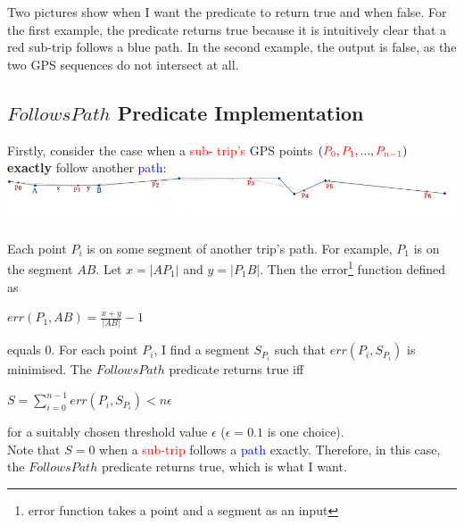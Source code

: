 \documentclass[12pt,a4paper,oneside,openright]{report}
\begin{document}
Two pictures show when I want the predicate to return true and when false.
For the first example, the predicate returns true because it is intuitively
clear that a red sub-trip follows a blue path. In the second example, the
output is false, as the two GPS sequences do not intersect at all.

\newpage

\subsection{$FollowsPath$ Predicate Implementation}

Firstly, consider the case when a \textcolor{red}{sub- trip's} GPS points
$(\textcolor{red}{P_0}, \textcolor{red}{P_1}, ..., \textcolor{red}{P_{n-1}})$
\textbf{exactly} follow another \textcolor{blue}{path}: \\

\includegraphics[width=\textwidth]{figs/follows_exactly.jpg}

Each point $P_i$ is on some segment of another trip's path.
For example, $P_1$ is on the segment $AB$.
Let $x = |AP_1|$ and $y = |P_1B|$. Then the
error\footnote{error function takes a point and a segment as an input} function
defined as \\

\begin{centering}
$err(P_1, AB) = \frac{x + y}{|AB|} - 1$ \\
\end{centering}

\:
\:
\:

equals $0$. For each point $P_i$, I find a segment $S_{P_i}$ such that
$err(P_i, S_{P_i})$ is minimised. The $FollowsPath$ predicate returns true
iff

\begin{centering}
    $S = \sum_{i=0}^{n-1} err(P_i, S_{P_i}) < n\epsilon$ \\
\end{centering}

\:
\:
\:

for a suitably chosen threshold value $\epsilon$ ($\epsilon = 0.1$ is one choice). \\

Note that $S = 0$ when a \textcolor{red}{sub-trip} follows a
\textcolor{blue}{path} exactly. Therefore, in this case, the $FollowsPath$
predicate returns true, which is what I want. \\
\end{document}
